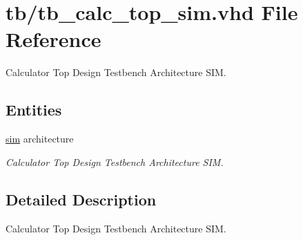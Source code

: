 \hypertarget{tb__calc__top__sim_8vhd}{}\section{tb/tb\+\_\+calc\+\_\+top\+\_\+sim.vhd File Reference}
\label{tb__calc__top__sim_8vhd}


Calculator Top Design Testbench Architecture S\+IM.  


\subsection*{Entities}
\begin{DoxyCompactItemize}
\item 
\hyperlink{classtb__calc__top_1_1sim}{sim} architecture
\begin{DoxyCompactList}\small\item\em Calculator Top Design Testbench Architecture S\+IM. \end{DoxyCompactList}\end{DoxyCompactItemize}


\subsection{Detailed Description}
Calculator Top Design Testbench Architecture S\+IM. 

